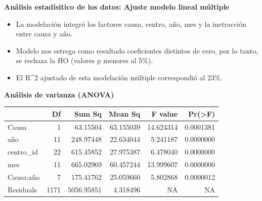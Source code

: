 \documentclass[
  ignorenonframetext,
]{beamer}
\begin{document}
\begin{frame}{\textbf{Análisis estadísitico de los datos: Ajuste modelo
lineal múltiple}}
\protect\hypertarget{anuxe1lisis-estaduxedsitico-de-los-datos-ajuste-modelo-lineal-muxfaltiple}{}
\begin{itemize}
\item
  La modelación integró los factores causa, centro, año, mes y la
  inetracción entre causa y año.
\item
  Modelo nos estrega como resultado coeficientes distintos de cero, por
  lo tanto, se rechaza la HO (valores p menores al 5\%).
\item
  El R\^{}2 ajustado de esta modelación múltiple correspondió al 23\%.
\end{itemize}
\end{frame}

\begin{frame}{\textbf{Análisis de varianza (ANOVA)}}
\protect\hypertarget{anuxe1lisis-de-varianza-anova}{}
\begin{table}
\centering
\begin{tabular}[t]{l|r|r|r|r|r}
\hline
  & Df & Sum Sq & Mean Sq & F value & Pr(>F)\\
\hline
Causa & 1 & 63.15504 & 63.155039 & 14.624314 & 0.0001381\\
\hline
año & 11 & 248.97448 & 22.634044 & 5.241187 & 0.0000000\\
\hline
centro\_id & 22 & 615.45852 & 27.975387 & 6.478040 & 0.0000000\\
\hline
mes & 11 & 665.02969 & 60.457244 & 13.999607 & 0.0000000\\
\hline
Causa:año & 7 & 175.41762 & 25.059660 & 5.802868 & 0.0000012\\
\hline
Residuals & 1171 & 5056.95851 & 4.318496 & NA & NA\\
\hline
\end{tabular}
\end{table}
\end{frame}
\end{document}
